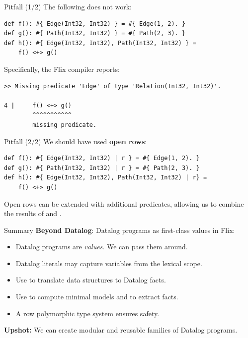 \begin{frame}[fragile]{Pitfall (1/2)}
The following does not work: 

\begin{lstlisting}[language=flix, xleftmargin=0.8cm]
def f(): #{ Edge(Int32, Int32) } = #{ Edge(1, 2). }
def g(): #{ Path(Int32, Int32) } = #{ Path(2, 3). }
def h(): #{ Edge(Int32, Int32), Path(Int32, Int32) } = 
    f() <+> g()
\end{lstlisting}

\pause Specifically, the Flix compiler reports:

\begin{lstlisting}[language=flix, xleftmargin=0.8cm]
>> Missing predicate 'Edge' of type 'Relation(Int32, Int32)'.

4 |     f() <+> g()
        ^^^^^^^^^^^
        missing predicate.
\end{lstlisting}
\end{frame}

\begin{frame}[fragile]{Pitfall (2/2)}
We should have used \textbf{open rows}:

\begin{lstlisting}[language=flix, xleftmargin=0.8cm]
def f(): #{ Edge(Int32, Int32) | r } = #{ Edge(1, 2). }
def g(): #{ Path(Int32, Int32) | r } = #{ Path(2, 3). }
def h(): #{ Edge(Int32, Int32), Path(Int32, Int32) | r} = 
    f() <+> g()
\end{lstlisting}

Open rows can be extended with additional predicates, allowing us to combine the results of  and .
\end{frame}

\begin{frame}{Summary}
\textbf{Beyond Datalog}: Datalog programs as first-class values in Flix:

\begin{itemize}
    \item Datalog programs are \emph{values}. We can pass them around.
    \item Datalog literals may capture variables from the lexical scope.
    \item Use \Code{inject} to translate data structures to Datalog facts.
    \item Use \Code{query} to compute minimal models and to extract facts.
    \item A row polymorphic type system ensures safety.
\end{itemize}

\textbf{Upshot:} We can create modular and reusable families of Datalog programs.
\end{frame}

